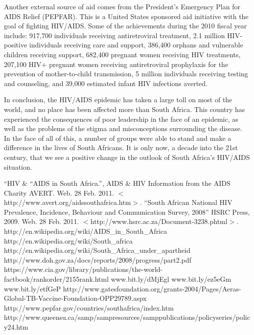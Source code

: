 \documentclass[12pt]{report}
\begin{document}
Another external source of aid comes from the President's Emergency Plan for AIDS Relief (PEPFAR).
This is a United States sponsored aid initiative with the goal of fighting HIV/AIDS.
Some of the achievements during the 2010 fiscal year include: 
    917,700 individuals receiving antiretroviral treatment, 
    2.1 million HIV-positive individuals receiving care and support, 
    386,400 orphans and vulnerable children receiving support, 
    682,400 pregnant women receiving HIV treatments, 
    207,100 HIV+ pregnant women receiving antiretroviral prophylaxis for the prevention of mother-to-child transmission, 
    5 million individuals receiving testing and counseling, 
    and 39,000 estimated infant HIV infections averted\cite{pepfar}.


In conclusion, the HIV/AIDS epidemic has taken a large toll on most of the world, and no place has been affected more than South Africa.
This country has experienced the consequences of poor leadership in the face of an epidemic, as well as the problems of the stigma and misconceptions surrounding the disease.
In the face of all of this, a number of groups were able to stand and make a difference in the lives of South Africans.
It is only now, a decade into the 21st century, that we see a positive change in the outlook of South Africa's HIV/AIDS situation.

\begin{thebibliography}{99}
    ``HIV \& ``AIDS in South Africa.'',
        AIDS \& HIV Information from the AIDS Charity AVERT. Web. 28 Feb. 2011. $<$http://www.avert.org/aidssouthafrica.htm$>$.
    ``South African National HIV Prevalence, Incidence, Behaviour and Communication Survey, 2008''
        HSRC Press, 2009. Web. 28 Feb. 2011. $<$http://www.hsrc.ac.za/Document-3238.phtml$>$. 
    http://en.wikipedia.org/wiki/AIDS\_in\_South\_Africa
    http://en.wikipedia.org/wiki/South\_africa
    http://en.wikipedia.org/wiki/South\_Africa\_under\_apartheid
    http://www.doh.gov.za/docs/reports/2008/progress/part2.pdf
    https://www.cia.gov/library/publications/the-world-factbook/rankorder/2155rank.html
    www.bit.ly/dMjEgl
    www.bit.ly/ez5eGm
    www.bit.ly/etfGeP
    http://www.gatesfoundation.org/grants-2004/Pages/Aeras-Global-TB-Vaccine-Foundation-OPP29789.aspx
    http://www.pepfar.gov/countries/southafrica/index.htm
    http://www.queensu.ca/samp/sampresources/samppublications/policyseries/policy24.htm
\end{thebibliography}
\end{document}
